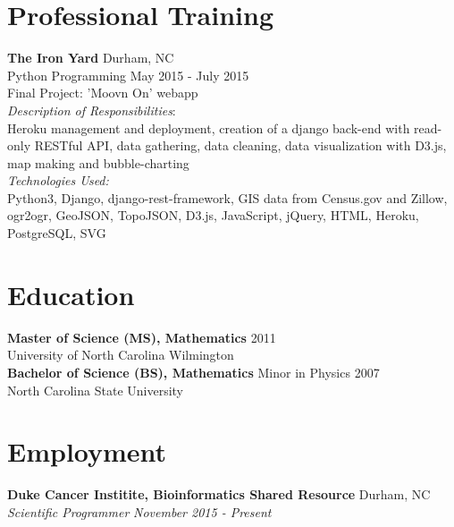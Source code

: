 \documentclass[11pt]{article}
\begin{document}

\section*{Professional Training}

{\bf The Iron Yard} \hfill Durham, NC\\
Python Programming \hfill {May 2015 - July 2015}
\vspace{5pt}\\
Final Project: 'Moovn On' webapp\\
{\it Description of Responsibilities}:\\
Heroku management and deployment, creation of a django back-end with read-only RESTful API, data gathering, data cleaning, data visualization with D3.js, map making and bubble-charting\\
{\it Technologies Used:}\\
Python3, Django, django-rest-framework, GIS data from Census.gov and Zillow, ogr2ogr, GeoJSON, TopoJSON, D3.js, JavaScript, jQuery, HTML, Heroku, PostgreSQL, SVG


\section*{Education}

{\bf Master of Science (MS), Mathematics} \hfill 2011\\
University of North Carolina Wilmington
\vspace{5pt}\\
\noindent
{\bf Bachelor of Science (BS), Mathematics} Minor in Physics \hfill 2007\\
North Carolina State University


\section*{Employment}

\noindent
{\bf Duke Cancer Institite, Bioinformatics Shared Resource} \hfill Durham, NC\\
{\it Scientific Programmer} \hfill {\it November 2015 - Present}
\end{document}
